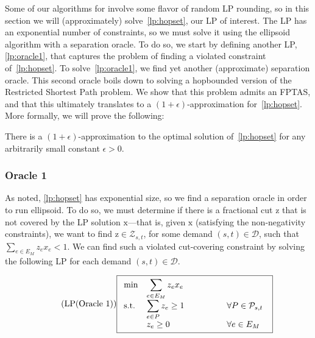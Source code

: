
Some of our algorithms for {\hopset} involve some flavor of random LP rounding, so in this section we will (approximately) solve~\ref{lp:hopset}, our LP of interest. The LP has an exponential number of constraints, so we must solve it using the ellipsoid algorithm with a separation oracle. To do so, we start by defining another LP, \ref{lp:oracle1}, that captures the problem of finding a violated constraint of~\ref{lp:hopset}. To solve~\ref{lp:oracle1}, we find yet another (approximate) separation oracle. This second oracle boils down to solving a hopbounded version of the Restricted Shortest Path problem. We show that this problem admits an FPTAS, and that this ultimately translates to a $(1+\epsilon)$-approximation for~\ref{lp:hopset}. More formally, we will prove the following:

\begin{theorem} \label{thm:solve_LP}
    There is a $(1+\epsilon)$-approximation to the optimal solution of~\ref{lp:hopset} for any arbitrarily small constant $\epsilon > 0$.
\end{theorem}

\subsubsection{Oracle 1}
As noted, \ref{lp:hopset} has exponential size, so we find a separation oracle in order to run ellipsoid. To do so, we must determine if there is a fractional cut $\bm{\mathrm{z}}$ that is not covered by the LP solution $\bm{\mathrm{x}}$---that is, given $\bm{\mathrm{x}}$ (satisfying the non-negativity constraints), we want to find $\bm{\mathrm{z}} \in \mathcal{Z}_{s,t}$, for some demand $(s,t) \in \mathcal{D}$, such that $\sum_{e \in E_M} z_e x_e < 1$. We can find such a violated cut-covering constraint by solving the following LP for each demand $(s,t) \in \mathcal{D}$.

\begin{equation} \label{lp:oracle1} \tag{LP(Oracle 1)}
\fbox{$
\begin{array}{lll}
\min & \displaystyle \sum_{e \in E_M} z_e x_e \\
\mathrm{s.t.} & \displaystyle \sum_{e \in P} z_e \geq 1 \qquad \qquad & \forall P \in \mathcal{P}_{s,t} \\
& \displaystyle z_e \geq 0 & \forall e \in E_M
\end{array}
$
}
\end{equation}


